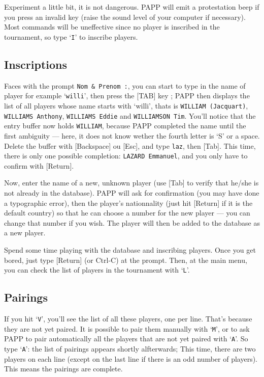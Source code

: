 \documentclass[10pt]{article}
\begin{document}
	Experiment a little bit, it is not dangerous.  PAPP will emit a 
protestation beep if you press an invalid key (raise the sound level 
of your computer if necessary). Most commands will be uneffective 
since no player is inscribed in the tournament, so type `\verb|I|' to 
inscribe players.

\subsection{Inscriptions}

Faces with the prompt \verb|Nom & Prenom :|, you can start to type in the name of player for example `\verb|willi|', then press the [TAB] key ; PAPP then displays the list of all players whose name starts with  `willi', thats is \verb|WILLIAM (Jacquart)|, \verb|WILLIAMS Anthony|, \verb|WILLIAMS Eddie| and \verb|WILLIAMSON Tim|.  You'll notice that the entry buffer now holds \verb|WILLIAM|, because PAPP completed the name until the first ambiguity --- here, it does not know wether the fourth letter is `S' 
or a space.  Delete the buffer with [Backspace] ou [Esc], and type 
\verb|laz|, then [Tab].  This time, there is only one possible 
completion: \verb|LAZARD Emmanuel|, and you only have to confirm with 
[Return].

	Now, enter the name of a new, unknown player (use [Tab]
to verify that he/she is not already in the database).  PAPP will
ask for confirmation (you may have done a typographic error), then 
the player's nationnality (just hit [Return] if it is the default 
country) so that he can choose a number for the new player  --- you 
can change that number if you wish.  The player will then be added to 
the database as a new player.

Spend some time playing with the database and inscribing players.  
Once you get bored, just type [Return] (or Ctrl-C) at the prompt.  
Then, at the main menu, you can check the list of players in the 
tournament with `\verb|L|'.


\subsection{Pairings}

If you hit `\verb|V|', you'll see the list of all these players, one 
per line.  That's because they are not yet paired.  It is possible to 
pair them manually with `\verb|M|', or to ask PAPP to pair 
automatically all the players that are not yet paired with `\verb|A|'.  
So type `\verb|A|': the list of pairings appears shortly alfterwards; 
This time, there are two players on each line (except on the last line 
if there is an odd number of players).  This means the pairings are 
complete.
\end{document}
